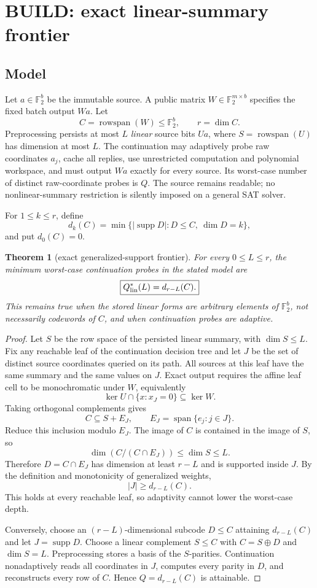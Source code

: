 \documentclass[11pt]{article}
\newtheorem{theorem}{Theorem}
\newcommand{\F}{\mathbb F_2}
\newcommand{\supp}{\operatorname{supp}}
\begin{document}
\section{BUILD: exact linear-summary frontier}

\subsection{Model}

Let $a\in\F^b$ be the immutable source.  A public matrix $W\in\F^{m\times b}$ specifies the fixed batch output $Wa$.  Let
\[
C=\operatorname{rowspan}(W)\le\F^b,\qquad r=\dim C.
\]
Preprocessing persists at most $L$ \emph{linear} source bits $Ua$, where $S=\operatorname{rowspan}(U)$ has dimension at most $L$.  The continuation may adaptively probe raw coordinates $a_j$, cache all replies, use unrestricted computation and polynomial workspace, and must output $Wa$ exactly for every source.  Its worst-case number of distinct raw-coordinate probes is $Q$.  The source remains readable; no nonlinear-summary restriction is silently imposed on a general SAT solver.

For $1\le k\le r$, define
\[
d_k(C)=\min\{\lvert\supp D\rvert:D\le C,\ \dim D=k\},
\]
and put $d_0(C)=0$.

\begin{theorem}[exact generalized-support frontier]\label{th:frontier}
For every $0\le L\le r$, the minimum worst-case continuation probes in the stated model are
\[
\boxed{Q^*_{\rm lin}(L)=d_{r-L}(C).}
\]
This remains true when the stored linear forms are arbitrary elements of $\F^b$, not necessarily codewords of $C$, and when continuation probes are adaptive.
\end{theorem}

\begin{proof}
Let $S$ be the row space of the persisted linear summary, with $\dim S\le L$.  Fix any reachable leaf of the continuation decision tree and let $J$ be the set of distinct source coordinates queried on its path.  All sources at this leaf have the same summary and the same values on $J$.  Exact output requires the affine leaf cell to be monochromatic under $W$, equivalently
\[
\ker U\cap\{x:x_J=0\}\subseteq\ker W.
\]
Taking orthogonal complements gives
\[
C\subseteq S+E_J,
\qquad E_J=\operatorname{span}\{e_j:j\in J\}.
\]
Reduce this inclusion modulo $E_J$.  The image of $C$ is contained in the image of $S$, so
\[
\dim(C/(C\cap E_J))\le\dim S\le L.
\]
Therefore $D=C\cap E_J$ has dimension at least $r-L$ and is supported inside $J$.  By the definition and monotonicity of generalized weights,
\[
|J|\ge d_{r-L}(C).
\]
This holds at every reachable leaf, so adaptivity cannot lower the worst-case depth.

Conversely, choose an $(r-L)$-dimensional subcode $D\le C$ attaining $d_{r-L}(C)$ and let $J=\supp D$.  Choose a linear complement $S\le C$ with $C=S\oplus D$ and $\dim S=L$.  Preprocessing stores a basis of the $S$-parities.  Continuation nonadaptively reads all coordinates in $J$, computes every parity in $D$, and reconstructs every row of $C$.  Hence $Q=d_{r-L}(C)$ is attainable.
\end{proof}
\end{document}
